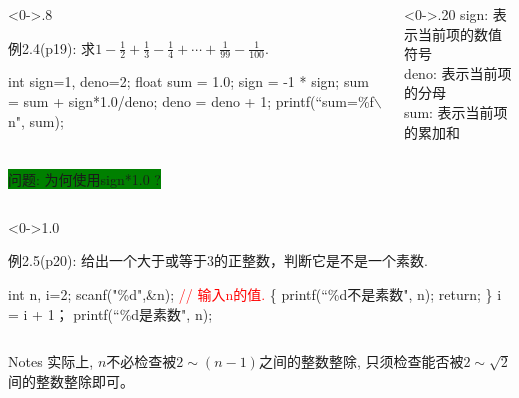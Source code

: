 \begin{frame}%
\begin{columns}%
	\begin{column}<0->{.8\textwidth}
		\begin{algorithm}[H]  
			\caption{例2.4(p19): 求$1-\frac{1}{2}+\frac{1}{3}-\frac{1}{4}+\cdots+\frac{1}{99}-\frac{1}{100}$.} %
			\begin{algorithmic}[1] %
				\State int sign=1, deno=2;
				\State float sum = 1.0; 
				\State sign = -1 * sign;
				\State sum = sum + sign*1.0/deno; 
				\State deno = deno + 1; 
				\EndWhile
				\State printf(``sum=\%f$\backslash$n", sum);	
			\end{algorithmic}  
		\end{algorithm}
	\end{column}%
	\begin{column}<0->{.20\textwidth}
		\newline
		\newline
		sign: 表示当前项的数值符号\\
		deno: 表示当前项的分母\\
		sum:  表示当前项的累加和
	\end{column}%
\end{columns}
\medskip
\colorbox{green}{问题: 为何使用sign*1.0 ?}
\end{frame}

\begin{frame}%
\begin{columns}%
	\begin{column}<0->{1.0\textwidth}
		\begin{algorithm}[H]  
			\caption{例2.5(p20): 给出一个大于或等于3的正整数，判断它是不是一个素数.} %
			\begin{algorithmic}[1] %
				\State int n, i=2;
				\State scanf("\%d",\&n); \textcolor{red}{// 输入n的值.} 
				 \{ printf(``\%d不是素数", n); return; \}
				\EndIf
				\State i = i + 1；
				\EndWhile
				\State printf(``\%d是素数", n);	
			\end{algorithmic}  
		\end{algorithm}
	\end{column}%
\end{columns}
\begin{block}{Notes}
	实际上, $n$不必检查被$2\sim(n-1)$之间的整数整除, 只须检查能否被$2\sim\sqrt{2}$间的整数整除即可。
\end{block}
\end{frame}

